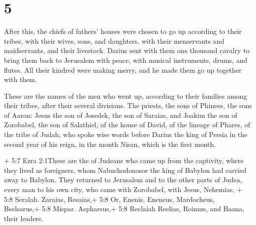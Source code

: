 \hypertarget{section-4}{%
\section{5}\label{section-4}}

 After this, the chiefs of fathers' houses were chosen to go
up according to their tribes, with their wives, sons, and daughters,
with their menservants and maidservants, and their livestock.
 Darius sent with them one thousand cavalry to bring them
back to Jerusalem with peace, with musical instruments, drums, and
flutes.  All their kindred were making merry, and he made
them go up together with them.

 These are the names of the men who went up, according to
their families among their tribes, after their several divisions.
 The priests, the sons of Phinees, the sons of Aaron: Jesus
the son of Josedek, the son of Saraias, and Joakim the son of Zorobabel,
the son of Salathiel, of the house of David, of the lineage of Phares,
of the tribe of Judah,  who spoke wise words before Darius
the king of Persia in the second year of his reign, in the month Nisan,
which is the first month.

 + 5:7 Ezra 2:1These are the of Judeans who came up from the
captivity, where they lived as foreigners, whom Nabuchodonosor the king
of Babylon had carried away to Babylon.  They returned to
Jerusalem and to the other parts of Judea, every man to his own city,
who came with Zorobabel, with Jesus, Nehemias, + 5:8 Seralah. Zaraias,
Resaias,+ 5:8 Or, Enenis. Eneneus, Mardocheus, Beelsarus,+ 5:8 Mispar.
Aspharsus,+ 5:8 Reclaiah Reelias, Roimus, and Baana, their leaders.

